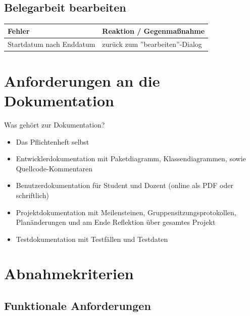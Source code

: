 \documentclass{article}
\begin{document}
\subsection{Belegarbeit bearbeiten}
\begin{tabular}{|p{7cm}|p{7cm}|}
\hline
	\textbf{Fehler}				&	\textbf{Reaktion / Gegenmaßnahme}	\\
\hline
\hline
	Startdatum nach Enddatum	&	zurück zum ''bearbeiten''-Dialog	\\
\hline
\end{tabular}

\section{Anforderungen an die Dokumentation}
Was gehört zur Dokumentation?
\begin{itemize}
\item Das Pflichtenheft selbst
\item Entwicklerdokumentation mit Paketdiagramm, Klassendiagrammen, sowie Quellcode-Kommentaren
\item Benutzerdokumentation für Student und Dozent (online als PDF oder schriftlich)
\item Projektdokumentation mit Meilensteinen, Gruppensitzungsprotokollen, Planänderungen und am Ende Reflektion über gesamtes Projekt
\item Testdokumentation mit Testfällen und Testdaten
\end{itemize}

\newpage
\section{Abnahmekriterien}
\subsection{Funktionale Anforderungen}
\end{document}
